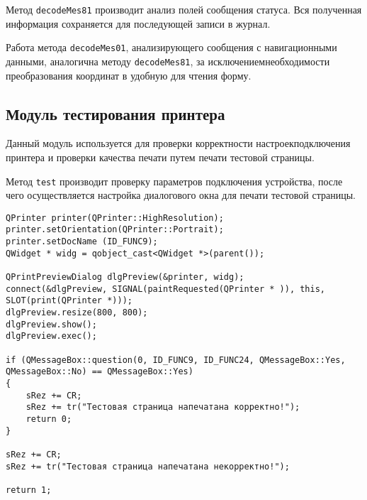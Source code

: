 Метод \texttt{decodeMes81} производит анализ полей сообщения статуса. Вся полученная информация сохраняется для
последующей записи в журнал.

Работа метода \texttt{decodeMes01}, анализирующего сообщения с навигационными данными, аналогична методу
\texttt{decodeMes81}, за исключением\break необходимости преобразования координат в удобную для чтения форму.

\subsection{Модуль тестирования принтера}
Данный модуль используется для проверки корректности настроек\break подключения принтера и проверки качества печати путем
печати тестовой страницы.

Метод \texttt{test} производит проверку параметров подключения устройства, после чего осуществляется настройка
диалогового окна для печати тестовой страницы.
\medskip
\begin{verbatim}
QPrinter printer(QPrinter::HighResolution);
printer.setOrientation(QPrinter::Portrait);
printer.setDocName (ID_FUNC9);
QWidget * widg = qobject_cast<QWidget *>(parent());

QPrintPreviewDialog dlgPreview(&printer, widg);
connect(&dlgPreview, SIGNAL(paintRequested(QPrinter * )), this, SLOT(print(QPrinter *)));
dlgPreview.resize(800, 800);
dlgPreview.show();
dlgPreview.exec();

if (QMessageBox::question(0, ID_FUNC9, ID_FUNC24, QMessageBox::Yes, QMessageBox::No) == QMessageBox::Yes)
{
	sRez += CR;
	sRez += tr("Тестовая страница напечатана корректно!");
	return 0;
}

sRez += CR;
sRez += tr("Тестовая страница напечатана некорректно!");

return 1;
\end{verbatim}
\medskip

